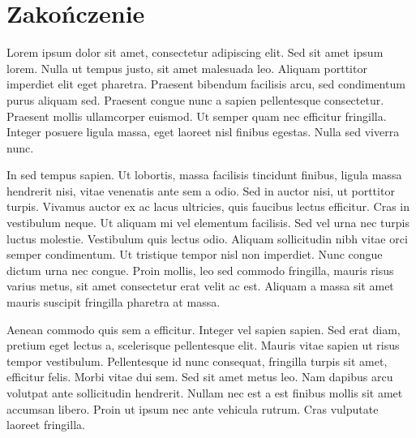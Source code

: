 \setlength{\parindent}{1.25cm} %

\section*{Zakończenie} %
\begin{spacing}{1.5} %

    Lorem ipsum dolor sit amet, consectetur adipiscing elit. Sed sit amet ipsum lorem. Nulla ut tempus justo, sit amet malesuada leo. Aliquam porttitor imperdiet elit eget pharetra. Praesent bibendum facilisis arcu, sed condimentum purus aliquam sed. Praesent congue nunc a sapien pellentesque consectetur. Praesent mollis ullamcorper euismod. Ut semper quam nec efficitur fringilla. Integer posuere ligula massa, eget laoreet nisl finibus egestas. Nulla sed viverra nunc.

    In sed tempus sapien. Ut lobortis, massa facilisis tincidunt finibus, ligula massa hendrerit nisi, vitae venenatis ante sem a odio. Sed in auctor nisi, ut porttitor turpis. Vivamus auctor ex ac lacus ultricies, quis faucibus lectus efficitur. Cras in vestibulum neque. Ut aliquam mi vel elementum facilisis. Sed vel urna nec turpis luctus molestie. Vestibulum quis lectus odio. Aliquam sollicitudin nibh vitae orci semper condimentum. Ut tristique tempor nisl non imperdiet. Nunc congue dictum urna nec congue. Proin mollis, leo sed commodo fringilla, mauris risus varius metus, sit amet consectetur erat velit ac est. Aliquam a massa sit amet mauris suscipit fringilla pharetra at massa.

    Aenean commodo quis sem a efficitur. Integer vel sapien sapien. Sed erat diam, pretium eget lectus a, scelerisque pellentesque elit. Mauris vitae sapien ut risus tempor vestibulum. Pellentesque id nunc consequat, fringilla turpis sit amet, efficitur felis. Morbi vitae dui sem. Sed sit amet metus leo. Nam dapibus arcu volutpat ante sollicitudin hendrerit. Nullam nec est a est finibus mollis sit amet accumsan libero. Proin ut ipsum nec ante vehicula rutrum. Cras vulputate laoreet fringilla.


\end{spacing}
